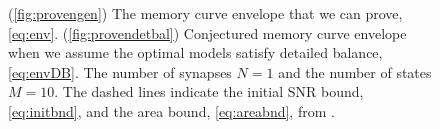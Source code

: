 \documentclass[12pt]{article}
\begin{document}
\begin{figure}[tb]
  \centering
  \begin{myenuma}
  \item{}\label{fig:provengen}
  \item{}\label{fig:provendetbal}
  \end{myenuma}
  \caption[Proven envelope for the signal-to-noise ratio]
  {(\ref{fig:provengen}) The memory curve envelope that we can prove, \cref{eq:env}.
  (\ref{fig:provendetbal}) Conjectured memory curve envelope when we assume the optimal models satisfy detailed balance, \cref{eq:envDB}.
  The number of synapses \(N=1\) and the number of states \(M=10\).
  The dashed lines indicate the initial SNR bound, \eqref{eq:initbnd}, and the area bound, \eqref{eq:areabnd}, from \cite{Lahiri2013synapse}.}\label{fig:envproven}
\end{figure}
\end{document}

